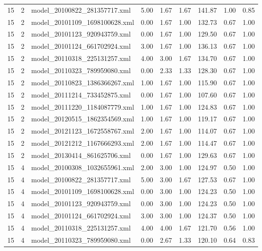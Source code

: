 \begin{table}[ht]
\begin{tabular}{rrlrrrrrr}
   15 &   2 & model\_20100822\_281357717.xml & 5.00 & 1.67 & 1.67 & 141.87 & 1.00 & 0.85 \\ 
   15 &   2 & model\_20101109\_1698100628.xml & 0.00 & 1.67 & 1.00 & 132.73 & 0.67 & 1.00 \\ 
   15 &   2 & model\_20101123\_920943759.xml & 0.00 & 1.67 & 1.00 & 129.50 & 0.67 & 1.00 \\ 
   15 &   2 & model\_20101124\_661702924.xml & 3.00 & 1.67 & 1.00 & 136.13 & 0.67 & 1.00 \\ 
   15 &   2 & model\_20110318\_225131257.xml & 4.00 & 3.00 & 1.67 & 134.70 & 0.67 & 1.00 \\ 
   15 &   2 & model\_20110323\_789959080.xml & 0.00 & 2.33 & 1.33 & 128.30 & 0.67 & 1.00 \\ 
   15 &   2 & model\_20110823\_1386366267.xml & 1.00 & 1.67 & 1.00 & 115.90 & 0.67 & 1.00 \\ 
   15 &   2 & model\_20111214\_733452875.xml & 0.00 & 1.67 & 1.00 & 107.60 & 0.67 & 1.00 \\ 
   15 &   2 & model\_20111220\_1184087779.xml & 1.00 & 1.67 & 1.00 & 124.83 & 0.67 & 1.00 \\ 
   15 &   2 & model\_20120515\_1862354569.xml & 1.00 & 1.67 & 1.00 & 119.17 & 0.67 & 1.00 \\ 
   15 &   2 & model\_20121123\_1672558767.xml & 2.00 & 1.67 & 1.00 & 114.07 & 0.67 & 1.00 \\ 
   15 &   2 & model\_20121212\_1167666293.xml & 2.00 & 1.67 & 1.00 & 114.47 & 0.67 & 1.00 \\ 
   15 &   2 & model\_20130414\_861625706.xml & 0.00 & 1.67 & 1.00 & 129.63 & 0.67 & 1.00 \\ 
   15 &   4 & model\_20100308\_1032655961.xml & 2.00 & 3.00 & 1.00 & 124.97 & 0.50 & 1.00 \\ 
   15 &   4 & model\_20100822\_281357717.xml & 5.00 & 3.00 & 1.67 & 127.53 & 0.67 & 1.00 \\ 
   15 &   4 & model\_20101109\_1698100628.xml & 0.00 & 3.00 & 1.00 & 124.23 & 0.50 & 1.00 \\ 
   15 &   4 & model\_20101123\_920943759.xml & 0.00 & 3.00 & 1.00 & 124.23 & 0.50 & 1.00 \\ 
   15 &   4 & model\_20101124\_661702924.xml & 3.00 & 3.00 & 1.00 & 124.37 & 0.50 & 1.00 \\ 
   15 &   4 & model\_20110318\_225131257.xml & 4.00 & 4.00 & 1.67 & 121.70 & 0.56 & 1.00 \\ 
   15 &   4 & model\_20110323\_789959080.xml & 0.00 & 2.67 & 1.33 & 120.10 & 0.64 & 0.83 \\ 

\end{tabular}
\end{table}
